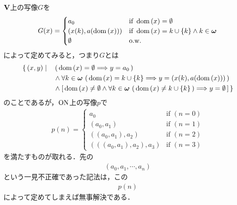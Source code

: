 		$\mathbf{V}$上の写像$G$を
		\begin{align}
			G(x) = 
			\begin{cases}
				a_0 & \mbox{if } \operatorname*{dom} \left(x\right) = \emptyset \\
				(x(k),a(\operatorname*{dom} \left(x\right))) & \mbox{if } \operatorname*{dom} \left(x\right) = k \cup \{k\} \wedge k \in {\boldsymbol \omega} \\
				\emptyset & \mbox{o.w.}
			\end{cases}
		\end{align}
		によって定めてみると，つまり$G$とは
		\begin{align}
			\{\, (x,y) \mid \quad &\left(\, \operatorname*{dom} \left(x\right) = \emptyset \Longrightarrow y = a_0\, \right) \\
		&\wedge \forall k \in {\boldsymbol \omega}\, \left(\, \operatorname*{dom} \left(x\right) = k \cup \{k\} \Longrightarrow y = (x(k),a(\operatorname*{dom} \left(x\right)))\, \right) \\
		&\wedge \left[\, \operatorname*{dom} \left(x\right) \neq \emptyset \wedge \forall k \in {\boldsymbol \omega}\, \left(\, \operatorname*{dom} \left(x\right) \neq k \cup \{k\}\, \right)
		\Longrightarrow y = \emptyset\, \right]\, \}
		\end{align}
		のことであるが，$\mathrm{ON}$上の写像$p$で
		\begin{align}
			p(n) =
			\begin{cases}
				a_0 & \mbox{if } (n = 0) \\
				(a_0,a_1) & \mbox{if } (n=1) \\
				((a_0,a_1),a_2) & \mbox{if } (n=2) \\
				(((a_0,a_1),a_2),a_3) & \mbox{if } (n=3)
			\end{cases}
		\end{align}
		を満たすものが取れる．先の
		\begin{align}
			(a_0,a_1,\cdots, a_n)
		\end{align}
		という一見不正確であった記法は，この
		\begin{align}
			p(n)
		\end{align}
		によって定めてしまえば無事解決である．
	